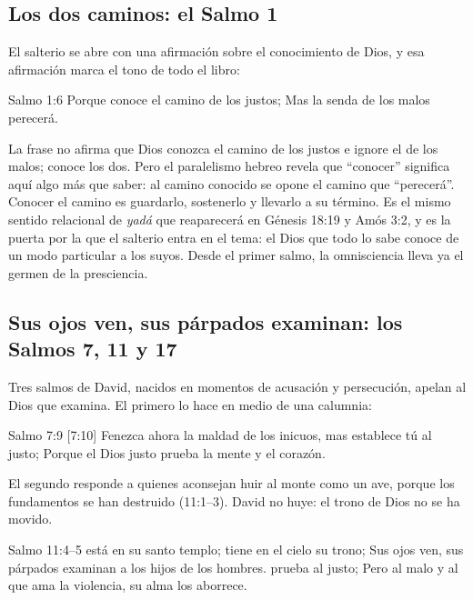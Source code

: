 \subsection{Los dos caminos: el Salmo 1}
El salterio se abre con una afirmación sobre el conocimiento de Dios, y esa afirmación marca el tono de todo el libro:

\begin{verso}{Salmo 1:6}
Porque \SENOR{} conoce el camino de los justos; Mas la senda de los malos perecerá.
\end{verso}

La frase no afirma que Dios conozca el camino de los justos e ignore el de los malos; conoce los dos. Pero el paralelismo hebreo revela que ``conocer'' significa aquí algo más que saber: al camino conocido se opone el camino que ``perecerá''. Conocer el camino es guardarlo, sostenerlo y llevarlo a su término. Es el mismo sentido relacional de \emph{yadá} que reaparecerá en Génesis 18:19 y Amós 3:2, y es la puerta por la que el salterio entra en el tema: el Dios que todo lo sabe conoce de un modo particular a los suyos. Desde el primer salmo, la omnisciencia lleva ya el germen de la presciencia.

\subsection{Sus ojos ven, sus párpados examinan: los Salmos 7, 11 y 17}
Tres salmos de David, nacidos en momentos de acusación y persecución, apelan al Dios que examina. El primero lo hace en medio de una calumnia:

\begin{verso}{Salmo 7:9 [7:10]}
Fenezca ahora la maldad de los inicuos, mas establece tú al justo; Porque el Dios justo prueba la mente y el corazón.
\end{verso}

El segundo responde a quienes aconsejan huir al monte como un ave, porque los fundamentos se han destruido (11:1--3). David no huye: el trono de Dios no se ha movido.

\begin{verso}{Salmo 11:4–5}
\SENOR{} está en su santo templo; \SENOR{} tiene en el cielo su trono; Sus ojos ven, sus párpados examinan a los hijos de los hombres. \SENOR{} prueba al justo; Pero al malo y al que ama la violencia, su alma los aborrece.
\end{verso}

